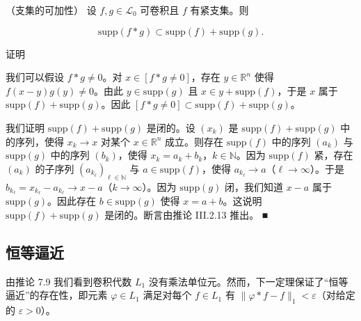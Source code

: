 \begin{theorem}

（支集的可加性） 设 $ f, g \in \mathcal{L}_{0} $ 可卷积且 $ f $ 有紧支集。则

\[
\mathrm{supp}(f * g) \subset \mathrm{supp}(f) + \mathrm{supp}(g) .
\]

证明

\begin{subitems}
\item

我们可以假设 $ f * g \neq 0 $。对 $ x \in [f * g \neq 0] $，存在 $ y \in \mathbb{R}^{n} $ 使得 $ f(x-y)g(y) \neq 0 $。由此 $ y \in \mathrm{supp}(g) $ 且 $ x \in y + \mathrm{supp}(f) $，于是 $ x $ 属于 $ \mathrm{supp}(f) + \mathrm{supp}(g) $。因此 $ [f * g \neq 0] \subset \mathrm{supp}(f) + \mathrm{supp}(g) $。

\item

我们证明 $ \mathrm{supp}(f) + \mathrm{supp}(g) $ 是闭的。设 $ (x_{k}) $ 是 $ \mathrm{supp}(f) + \mathrm{supp}(g) $ 中的序列，使得 $ x_{k} \to x $ 对某个 $ x \in \mathbb{R}^{n} $ 成立。则存在 $ \mathrm{supp}(f) $ 中的序列 $ (a_{k}) $ 与 $ \mathrm{supp}(g) $ 中的序列 $ (b_{k}) $，使得 $ x_{k} = a_{k} + b_{k} $，$ k \in \mathbb{N} $。因为 $ \mathrm{supp}(f) $ 紧，存在 $ (a_{k}) $ 的子序列 $ (a_{k_{\ell}})_{\ell \in \mathbb{N}} $ 与 $ a \in \mathrm{supp}(f) $，使得 $ a_{k_{\ell}} \to a $（$ \ell \to \infty $）。于是 $ b_{k_{\ell}} = x_{k_{\ell}} - a_{k_{\ell}} \to x - a $（$ k \to \infty $）。因为 $ \mathrm{supp}(g) $ 闭，我们知道 $ x-a $ 属于 $ \mathrm{supp}(g) $。因此存在 $ b \in \mathrm{supp}(g) $ 使得 $ x = a+b $。这说明 $ \mathrm{supp}(f) + \mathrm{supp}(g) $ 是闭的。断言由推论 III.2.13 推出。 \nobreak\hspace{0.35em}■

\end{subitems}

\end{theorem}

\subsection*{恒等逼近}

由推论 7.9 我们看到卷积代数 $ L_{1} $ 没有乘法单位元。然而，下一定理保证了“恒等逼近”的存在性，即元素 $ \varphi \in L_{1} $ 满足对每个 $ f \in L_{1} $ 有 $ \|\varphi * f - f\|_{1} < \varepsilon $（对给定的 $ \varepsilon > 0 $）。

